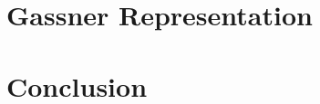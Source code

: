 \documentclass[x11names,reqno,12pt]{extarticle}
\begin{document}
\section{Gassner Representation}

\section{Conclusion}


\end{document}
